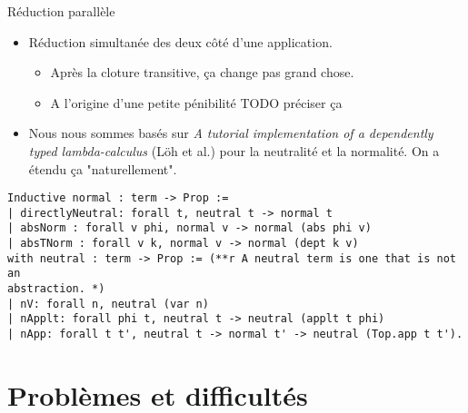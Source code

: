 \documentclass{beamer}
\begin{document}
\begin{frame}{Réduction parallèle}
\begin{itemize}
\item Réduction simultanée des deux côté d'une application.
\begin{itemize}
\item Après la cloture transitive, ça change pas grand chose.
\item A l'origine d'une petite pénibilité TODO préciser ça
\end{itemize}
\item Nous nous sommes basés sur \emph{A tutorial implementation of a
dependently typed lambda-calculus} (Löh et al.) pour la neutralité et la
normalité. On a étendu ça "naturellement".
\end{itemize}
\end{frame}

\begin{frame}
\begin{verbatim}
Inductive normal : term -> Prop :=
| directlyNeutral: forall t, neutral t -> normal t
| absNorm : forall v phi, normal v -> normal (abs phi v)
| absTNorm : forall v k, normal v -> normal (dept k v)
with neutral : term -> Prop := (**r A neutral term is one that is not an
abstraction. *)
| nV: forall n, neutral (var n)
| nApplt: forall phi t, neutral t -> neutral (applt t phi)
| nApp: forall t t', neutral t -> normal t' -> neutral (Top.app t t').
\end{verbatim}
\end{frame}

\section{Problèmes et difficultés}

\begin{frame}
\end{frame}
\end{document}
